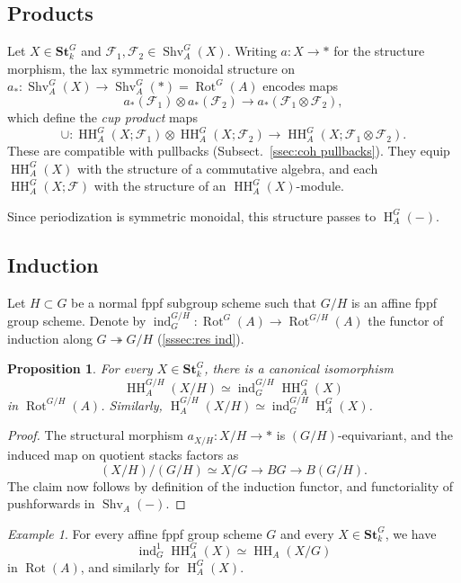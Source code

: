 \documentclass[12pt, oneside]{amsart}
\numberwithin{equation}{section}
\newtheorem{proposition}[subsubsection]{Proposition}
\theoremstyle{remark}
\newtheorem{example}[subsubsection]{Example}
\theoremstyle{plain}
\newcommand{\Stk}{\mathbf{St}_{k}}
\newcommand{\HH}{\operatorname{HH}}
\newcommand{\Hcoh}{\operatorname{H}}
\newcommand{\Shv}{\operatorname{Shv}}
\newcommand{\Rot}{\operatorname{Rot}}
\newcommand{\cF}{\mathcal{F}}
\begin{document}
\subsection{Products}\label{ssec:coh products}

Let $X \in \Stk^G$ and $\cF_1, \cF_2 \in \Shv_A^G(X)$.
Writing $a : X \to *$ for the structure morphism, the lax symmetric monoidal structure on $a_* : \Shv_A^G(X) \to \Shv_A^G(*) = \Rot^G(A)$ encodes maps
\[
  a_*(\cF_1) \otimes a_*(\cF_2) \to a_*(\cF_1\otimes\cF_2),
\]
which define the \emph{cup product} maps
\[
  \cup : \HH_A^G(X;\cF_1)\otimes \HH_A^G(X;\cF_2) \longrightarrow \HH_A^G(X;\cF_1\otimes\cF_2).
\]
These are compatible with pullbacks (Subsect.~\ref{ssec:coh pullbacks}).
They equip $\HH_A^G(X)$ with the structure of a commutative algebra, and each $\HH_A^G(X;\cF)$ with the structure of an $\HH_A^G(X)$-module.

Since periodization is symmetric monoidal, this structure passes to $\Hcoh_A^G(-)$.

\subsection{Induction}\label{ssec:coh induction}

Let $H \subset G$ be a normal fppf subgroup scheme such that $G/H$ is an affine fppf group scheme.
Denote by $\operatorname{ind}_G^{G/H} : \Rot^G(A) \to \Rot^{G/H}(A)$ the functor of induction along $G \twoheadrightarrow G/H$ (\ref{sssec:res ind}).

\begin{proposition}\label{prop:coh induction}
For every $X \in \Stk^G$, there is a canonical isomorphism
\[ \HH_A^{G/H}(X/H) \simeq \operatorname{ind}^{G/H}_G \HH_A^G(X) \]
in $\Rot^{G/H}(A)$.
Similarly, $\Hcoh_A^{G/H}(X/H) \simeq \operatorname{ind}^{G/H}_G \Hcoh_A^G(X)$.
\end{proposition}
\begin{proof}
The structural morphism $a_{X/H} : X/H \to *$ is $(G/H)$-equivariant, and the induced map on quotient stacks factors as
\[
  (X/H)/(G/H) \simeq
  X/G \to
  BG \to
  B(G/H).
\]
The claim now follows by definition of the induction functor, and functoriality of pushforwards in $\Shv_A(-)$.
\end{proof}

\begin{example}\label{exam:ind_G^1 HH}
	For every affine fppf group scheme $G$ and every $X \in \Stk^G$, we have
	\[
	  \operatorname{ind}_G^1 \HH_A^G(X) \simeq \HH_A(X/G)
	\]
	in $\Rot(A)$, and similarly for $\Hcoh_A^G(X)$.
\end{example}
\end{document}
